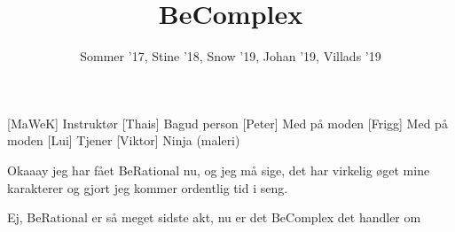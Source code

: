 \documentclass[a4paper,11pt]{article}
\title{BeComplex}
\author{Sommer '17, Stine '18, Snow '19, Johan '19, Villads '19}
\begin{document}
\maketitle

\begin{roles}
[MaWeK] Instruktør
[Thais] Bagud person
[Peter] Med på moden
[Frigg] Med på moden
[Lui] Tjener
[Viktor] Ninja (maleri)
\end{roles}

\begin{props}
\end{props}


\begin{sketch}

 Okaaay jeg har fået BeRational nu, og jeg må sige, det har virkelig øget mine karakterer og gjort jeg kommer ordentlig tid i seng.

 Ej, BeRational er så meget sidste akt, nu er det BeComplex det handler om



\end{sketch}
\end{document}
